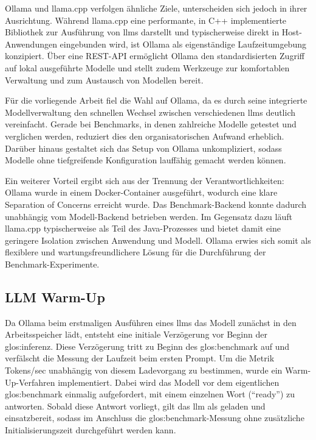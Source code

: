 Ollama und llama.cpp verfolgen ähnliche Ziele, unterscheiden sich jedoch in ihrer Ausrichtung.
Während llama.cpp eine performante, in C++ implementierte Bibliothek zur Ausführung von \glspl{llm} darstellt und typischerweise direkt in Host-Anwendungen eingebunden wird, ist Ollama als eigenständige Laufzeitumgebung konzipiert.
Über eine REST-API ermöglicht Ollama den standardisierten Zugriff auf lokal ausgeführte Modelle und stellt zudem Werkzeuge zur komfortablen Verwaltung und zum Austausch von Modellen bereit.

Für die vorliegende Arbeit fiel die Wahl auf Ollama, da es durch seine integrierte Modellverwaltung den schnellen Wechsel zwischen verschiedenen \glspl{llm} deutlich vereinfacht.
Gerade bei Benchmarks, in denen zahlreiche Modelle getestet und verglichen werden, reduziert dies den organisatorischen Aufwand erheblich.
Darüber hinaus gestaltet sich das Setup von Ollama unkompliziert, sodass Modelle ohne tiefgreifende Konfiguration lauffähig gemacht werden können.

Ein weiterer Vorteil ergibt sich aus der Trennung der Verantwortlichkeiten: Ollama wurde in einem Docker-Container ausgeführt, wodurch eine klare Separation of Concerns erreicht wurde.
Das Benchmark-Backend konnte dadurch unabhängig vom Modell-Backend betrieben werden.
Im Gegensatz dazu läuft llama.cpp typischerweise als Teil des Java-Prozesses und bietet damit eine geringere Isolation zwischen Anwendung und Modell.
Ollama erwies sich somit als flexiblere und wartungsfreundlichere Lösung für die Durchführung der Benchmark-Experimente.


\subsection{LLM Warm-Up}\label{subsec:llm-warm-up}

Da Ollama beim erstmaligen Ausführen eines \glspl{llm} das Modell zunächst in den Arbeitsspeicher lädt, entsteht eine initiale Verzögerung vor Beginn der \gls{glos:inferenz}.
Diese Verzögerung tritt zu Beginn des \gls{glos:benchmark} auf und verfälscht die Messung der Laufzeit beim ersten Prompt.
Um die Metrik Tokens/sec unabhängig von diesem Ladevorgang zu bestimmen, wurde ein Warm-Up-Verfahren implementiert.
Dabei wird das Modell vor dem eigentlichen \gls{glos:benchmark} einmalig aufgefordert, mit einem einzelnen Wort (\enquote{ready}) zu antworten.
Sobald diese Antwort vorliegt, gilt das \gls{llm} als geladen und einsatzbereit, sodass im Anschluss die \gls{glos:benchmark}-Messung ohne zusätzliche Initialisierungszeit durchgeführt werden kann.

